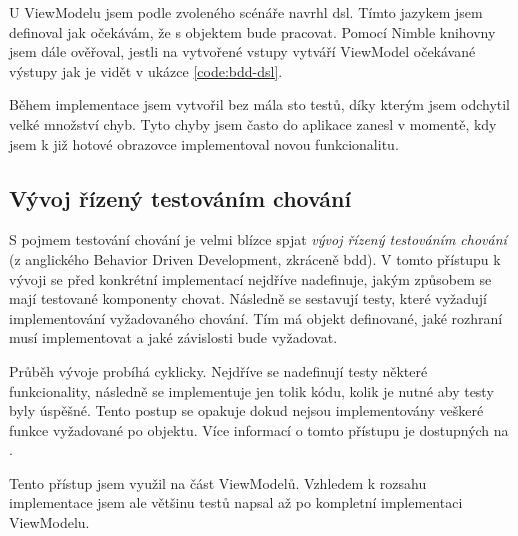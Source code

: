 U ViewModelu jsem podle zvoleného scénáře navrhl \acrshort{dsl}.
Tímto jazykem jsem definoval jak očekávám, že s objektem bude pracovat.
Pomocí Nimble knihovny jsem dále ověřoval, jestli na vytvořené vstupy vytváří ViewModel očekávané výstupy jak je vidět v ukázce \ref{code:bdd-dsl}.

Během implementace jsem vytvořil bez mála sto testů, díky kterým jsem odchytil velké množství chyb.
Tyto chyby jsem často do aplikace zanesl v momentě, kdy jsem k již hotové obrazovce implementoval novou funkcionalitu.


\subsection{Vývoj řízený testováním chování}

S pojmem testování chování je velmi blízce spjat \textit{vývoj řízený testováním chování} (z anglického Behavior Driven Development, zkráceně \acrshort{bdd}).
V tomto přístupu k vývoji se před konkrétní implementací nejdříve nadefinuje, jakým způsobem se mají testované komponenty chovat.
Následně se sestavují testy, které vyžadují implementování vyžadovaného chování.
Tím má objekt definované, jaké rozhraní musí implementovat a jaké závislosti bude vyžadovat.

Průběh vývoje probíhá cyklicky.
Nejdříve se nadefinují testy některé funkcionality, následně se implementuje jen tolik kódu, kolik je nutné aby testy byly úspěšné.
Tento postup se opakuje dokud nejsou implementovány veškeré funkce vyžadované po objektu.
Více informací o tomto přístupu je dostupných na \cite{objcio-bdd}.

Tento přístup jsem využil na část ViewModelů.
Vzhledem k rozsahu implementace jsem ale většinu testů napsal až po kompletní implementaci ViewModelu.
